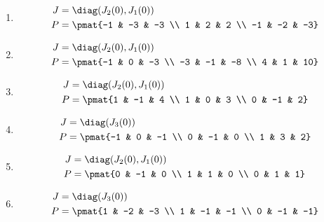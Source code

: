 \begin{enumerate}
\item

\begin{align*}
J &= \diag(J_{2}(0), J_{1}(0))\\
P &= \pmat{-1 & -3 & -3 \\ 1 & 2 & 2 \\ -1 & -2 & -3}
\end{align*}

\item

\begin{align*}
J &= \diag(J_{2}(0), J_{1}(0))\\
P &= \pmat{-1 & 0 & -3 \\ -3 & -1 & -8 \\ 4 & 1 & 10}
\end{align*}

\item

\begin{align*}
J &= \diag(J_{2}(0), J_{1}(0))\\
P &= \pmat{1 & -1 & 4 \\ 1 & 0 & 3 \\ 0 & -1 & 2}
\end{align*}

\item

\begin{align*}
J &= \diag(J_{3}(0))\\
P &= \pmat{-1 & 0 & -1 \\ 0 & -1 & 0 \\ 1 & 3 & 2}
\end{align*}

\item

\begin{align*}
J &= \diag(J_{2}(0), J_{1}(0))\\
P &= \pmat{0 & -1 & 0 \\ 1 & 1 & 0 \\ 0 & 1 & 1}
\end{align*}

\item

\begin{align*}
J &= \diag(J_{3}(0))\\
P &= \pmat{1 & -2 & -3 \\ 1 & -1 & -1 \\ 0 & -1 & -1}
\end{align*}


\end{enumerate}
